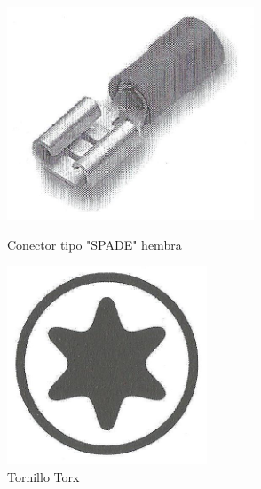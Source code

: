 \documentclass[a5paper,twoside,openany]{book}
\begin{document}
\begin{figure}[h]
    \centering
    \begin{minipage}[b]{0.45\textwidth}
        \centering
        \includegraphics[width=\textwidth]{spade-female} 
        \caption*{Conector tipo "SPADE" hembra}
    \end{minipage}
    \hfill
    \begin{minipage}[b]{0.45\textwidth}
        \centering
        \includegraphics[width=\textwidth]{torx-symbol} 
        \caption*{Tornillo Torx}
    \end{minipage}
\end{figure}
\end{document}
